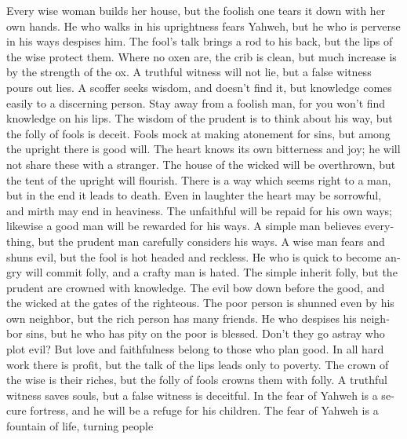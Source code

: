 \begin{paracol}{2}
\begin{otherlanguage}{english}
 Every wise woman builds her house, but the foolish one
tears it down with her own hands.  He who walks in his
uprightness fears Yahweh, but he who is perverse in his ways despises
him.  The fool's talk brings a rod to his back, but the
lips of the wise protect them.  Where no oxen are, the
crib is clean, but much increase is by the strength of the ox.
 A truthful witness will not lie, but a false witness
pours out lies.  A scoffer seeks wisdom, and doesn't find
it, but knowledge comes easily to a discerning person. 
Stay away from a foolish man, for you won't find knowledge on his lips.
 The wisdom of the prudent is to think about his way, but
the folly of fools is deceit.  Fools mock at making
atonement for sins, but among the upright there is good will.
 The heart knows its own bitterness and joy; he will not
share these with a stranger.  The house of the wicked
will be overthrown, but the tent of the upright will flourish.
 There is a way which seems right to a man, but in the
end it leads to death.  Even in laughter the heart may be
sorrowful, and mirth may end in heaviness.  The
unfaithful will be repaid for his own ways; likewise a good man will be
rewarded for his ways.  A simple man believes everything,
but the prudent man carefully considers his ways.  A wise
man fears and shuns evil, but the fool is hot headed and reckless.
 He who is quick to become angry will commit folly, and a
crafty man is hated.  The simple inherit folly, but the
prudent are crowned with knowledge.  The evil bow down
before the good, and the wicked at the gates of the righteous.
 The poor person is shunned even by his own neighbor, but
the rich person has many friends.  He who despises his
neighbor sins, but he who has pity on the poor is blessed.
 Don't they go astray who plot evil? But love and
faithfulness belong to those who plan good.  In all hard
work there is profit, but the talk of the lips leads only to poverty.
 The crown of the wise is their riches, but the folly of
fools crowns them with folly.  A truthful witness saves
souls, but a false witness is deceitful.  In the fear of
Yahweh is a secure fortress, and he will be a refuge for his children.
 The fear of Yahweh is a fountain of life, turning people

\end{otherlanguage}
\end{paracol}
